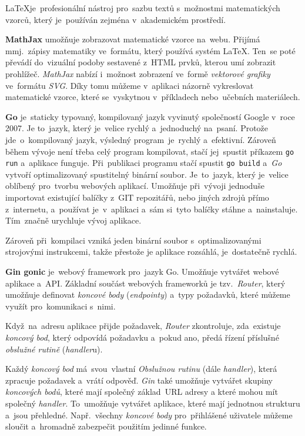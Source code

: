\documentclass[10pt,a4paper]{article}
\begin{document}
            \LaTeX je~profesionální nástroj pro~sazbu textů s~možnostmi matematických vzorců, který je~používán zejména v~akademickém prostředí.\cite{Rybicka2003:latex}
            
            \textbf{MathJax} umožňuje zobrazovat matematické vzorce na~webu. Přijímá mmj.~zápisy matematiky ve~formátu, který používá systém \LaTeX. Ten~se poté převádí do~vizuální podoby sestavené z~HTML prvků, kterou umí zobrazit prohlížeč. \emph{MathJax} nabízí i~možnost zobrazení ve~formě \emph{vektorové grafiky} ve~formátu \emph{SVG}. Díky tomu můžeme v~aplikaci názorně vykreslovat matematické vzorce, které se~vyskytnou v~příkladech nebo~učebních materiálech. \cite{abclinuxuMatematickxE9Vzorce}

            \textbf{Go} je~staticky typovaný, kompilovaný jazyk vyvinutý společností Google v~roce 2007. Je to~jazyk, který je~velice rychlý a~jednoduchý na~psaní. Protože jde~o~kompilovaný jazyk, výsledný program~je~rychlý a~efektivní. Zároveň během vývoje není třeba celý program kompilovat, stačí jej~spustit příkazem \texttt{go run} a~aplikace funguje. Při~publikaci programu stačí spustit \texttt{go build} a~\emph{Go} vytvoří optimalizovaný spustitelný binární soubor. Je~to~jazyk, který je~velice oblíbený pro~tvorbu webových aplikací. Umožňuje při~vývoji jednoduše importovat existující balíčky z~GIT repozitářů, nebo jiných zdrojů přímo z~internetu, a~používat je~v~aplikaci a~sám si~tyto balíčky stáhne a~nainstaluje. Tím~značně urychluje vývoj aplikace.

            Zároveň při~kompilaci vzniká jeden binární soubor s~optimalizovanými strojovými instrukcemi, takže přestože je aplikace rozsáhlá, je~dostatečně rychlá.

            \textbf{Gin gonic} je~webový framework pro~jazyk Go. Umožňuje vytvářet webové aplikace a~API. Základní součást webových frameworků je tzv.~\emph{Router}, který umožňuje definovat \emph{koncové body} (\emph{endpointy}) a~typy požadavků, které můžeme využít pro~komunikaci s~nimi.
            
            Když~na~adresu aplikace přijde požadavek, \emph{Router} zkontroluje, zda~existuje \emph{koncový bod}, který odpovídá požadavku a~pokud ano, předá řízení příslušné \emph{obslužné rutině} (\emph{handler}u).

            Každý \emph{koncový bod} má~svou~vlastní \emph{Obslužnou rutinu} (dále \emph{handler}), která zpracuje požadavek a~vrátí odpověď.
            \emph{Gin} také umožňuje vytvářet skupiny \emph{koncových bodů}, které mají společný základ~URL adresy a které mohou mít společný \emph{handler}. To~umožňuje vytvářet aplikace, které mají jednotnou strukturu a~jsou přehledné. Např.~všechny \emph{koncové body} pro~přihlášené uživatele můžeme sloučit a~hromadně zabezpečit použitím jedinné funkce.
\end{document}
